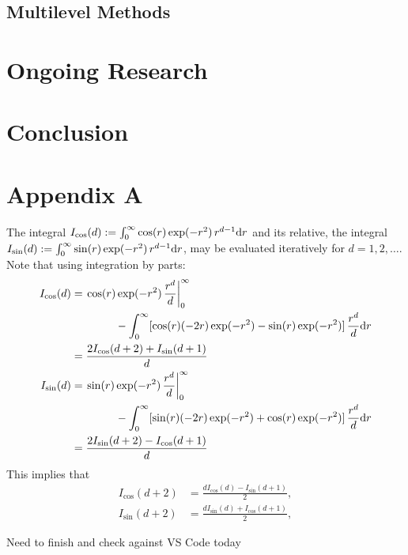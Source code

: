 \documentclass{svproc}
\begin{document}
\subsection{Multilevel Methods}

\section{Ongoing Research} \label{sec:onging}
\section{Conclusion} \label{sec:conclusion}






\section*{Appendix A}
The integral $I_{\cos}(d) := \int_{0}^{\infty} \cos(r) \exp(-r^2) \, r^{d-1} {\mathrm{d}} r$ and its relative, the integral $I_{\sin}(d) := \int_{0}^{\infty} \sin(r) \exp(-r^2) \, r^{d-1} {\mathrm{d}} r$, may be evaluated iteratively for $d = 1, 2, \ldots$.  Note that using integration by parts:
\begin{align*}
I_{\cos}(d)
	&=  \left .   \cos(r) \exp(-r^2) \, \frac{r^{d}}{d}  \right \rvert_0^{\infty} \\
	& \qquad \qquad - \int_{0}^{\infty} [\cos(r) (-2r )\exp(-r^2) -\sin(r)  \exp(-r^2)] \,  \frac{r^{d}}{d} {\mathrm{d}} r \\
	&= \frac{2 I_{\cos}(d+2) + I_{\sin}(d+1)}{d} \\
	I_{\sin}(d) &=  \left .   \sin(r) \exp(-r^2) \, \frac{r^{d}}{d}  \right \rvert_0^{\infty} \\
	&\qquad \qquad - \int_{0}^{\infty} [\sin(r) (-2r )\exp(-r^2) + \cos(r)  \exp(-r^2)] \,  \frac{r^{d}}{d} {\mathrm{d}} r \\
&= \frac{2 I_{\sin}(d+2) - I_{\cos}(d+1)}{d}
\end{align*}
This implies that
\begin{align*}
	I_{\cos}(d+2) & = \frac{d I_{\cos}(d) - I_{\sin}(d+1)}{2},   \\
	I_{\sin}(d+2) &=   \frac{d I_{\sin}(d) + I_{\cos}(d+1)}{2},
\end{align*}

Need to finish and check against VS Code today
\end{document}
